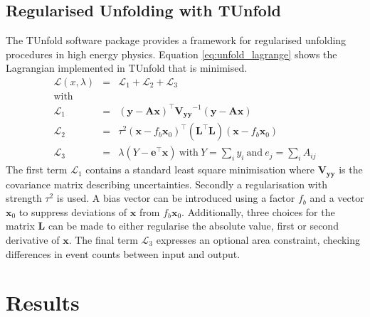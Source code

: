 \subsection{Regularised Unfolding with TUnfold}
	The TUnfold software package \cite{tunfold} provides a framework for regularised unfolding procedures in high energy physics. Equation \ref{eq:unfold_lagrange} shows the Lagrangian implemented in TUnfold that is minimised.
	\begin{eqnarray}
	\label{eq:unfold_lagrange}
	\mathcal{L}(x,\lambda) &=& \mathcal{L}_1 + \mathcal{L}_2 + \mathcal{L}_3 
	\\ \nonumber \text{with}
	\\ 
	\label{eq:unfold_lagrange1}
	\mathcal{L}_1 &=& (\mathbf{y} - \mathbf{Ax})^\intercal \mathbf{V_{yy}}^{-1} (\mathbf{y} - \mathbf{Ax}) 
	\\
	\label{eq:unfold_lagrange2}
	\mathcal{L}_2 &=& \tau^2 (\mathbf{x} - f_b \mathbf{x}_0)^\intercal (\mathbf{L}^\intercal \mathbf{L}) (\mathbf{x} - f_b \mathbf{x}_0) 
	\\
	\label{eq:unfold_lagrange3}
	\mathcal{L}_3 &=& \lambda (Y-\mathbf{e}^\intercal \mathbf{x}) \ \text{with} \ Y=\sum_{i} y_i \ \text{and} \ e_j = \sum_{i}A_{ij}
	\end{eqnarray}
	The first term $\mathcal{L}_1$ contains a standard least square minimisation where $\mathbf{V_{yy}}$ is the covariance matrix describing uncertainties. Secondly a regularisation with strength $\tau^2$ is used. A bias vector can be introduced using a factor $f_b$ and a vector $\mathbf{x}_0$ to suppress deviations of $\mathbf{x}$ from $f_b\mathbf{x}_0$. Additionally, three choices for the matrix $\mathbf{L}$ can be made to either regularise the absolute value, first or second derivative of $\mathbf{x}$. The final term $\mathcal{L}_3$ expresses an optional area constraint, checking differences in event counts between input and output.
	
 
 
\section{Results}
\label{sec:results}

